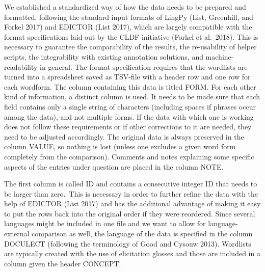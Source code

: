 \documentclass[
  english,
  a4paper,
  oneside,tablecaptionabove
]{scrbook}
\begin{document}
We established a standardized way of how the data needs to be prepared
and formatted, following the standard input formats of LingPy (List,
Greenhill, and Forkel 2017) and EDICTOR (List 2017), which are largely
compatible with the format specifications laid out by the CLDF
initiative (Forkel et al.~2018). This is necessary to guarantee the
comparability of the results, the re-usability of helper scripts, the
integrability with existing annotation solutions, and
machine-readability in general. The format specification requires that
the wordlists are turned into a spreadsheet saved as TSV-file with a
header row and one row for each wordform. The column containing this
data is titled FORM. For each other kind of information, a distinct
column is used. It needs to be made sure that each field contains only a
single string of characters (including spaces if phrases occur among the
data), and not multiple forms. If the data with which one is working
does not follow these requirements or if other corrections to it are
needed, they need to be adjusted accordingly. The original data is
always preserved in the column VALUE, so nothing is lost (unless one
excludes a given word form completely from the comparison). Comments and
notes explaining some specific aspects of the entries under question are
placed in the column NOTE.

The first column is called ID and contains a consecutive integer ID that
needs to be larger than zero.~This is necessary in order to further
refine the data with the help of EDICTOR (List 2017) and has the
additional advantage of making it easy to put the rows back into the
original order if they were reordered. Since several languages might be
included in one file and we want to allow for language-external
comparison as well, the language of the data is specified in the column
DOCULECT (following the terminology of Good and Cysouw 2013). Wordlists
are typically created with the use of elicitation glosses and those are
included in a column given the header CONCEPT.
\end{document}
